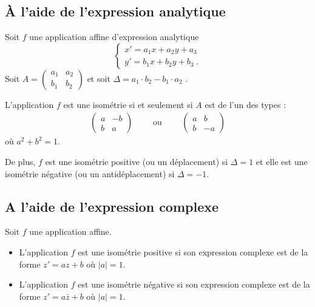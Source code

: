       \subsection{\`A l'aide de l'expression analytique}
            Soit $f$ une application affine d'expression analytique 
            \[
                  \left\lbrace
                        \begin{array}{l}
                              x' = a_1 x + a_2 y + a_3 \\
                              y' = b_1 x + b_2 y + b_3 \;.
                        \end{array}
                  \right.
            \]
            Soit 
            $ A = \begin{pmatrix} a_1 & a_2 \\ b_1 & b_2 \end{pmatrix} $
            et soit $\Delta = a_1 \cdot b_2 - b_1 \cdot a_2$
            .
            \begin{prop}
                  L'application $f$ est une isom\'etrie si et seulement si $A$ est de l'un des types : 
                  \begin{align*}
                        \begin{pmatrix}
                              a & -b \\ b & a 
                        \end{pmatrix}
                              \qquad \text{ ou } \qquad
                        \begin{pmatrix}
                              a & b \\ b & -a
                        \end{pmatrix}
                  \end{align*}
                  o\`u $a^2 + b^2 = 1$.
                  
                  De plus, $f$ est une isom\'etrie positive (ou un d\'eplacement) si $\Delta = 1$
                  et elle est une isom\'etrie n\'egative (ou un antid\'eplacement) si $\Delta = -1$.
            \end{prop}
      \subsection{A l'aide de l'expression complexe}
            Soit $f$ une application affine.
            \begin{itemize}
                  \item L'application $f$ est une isom\'etrie positive si son expression complexe est de la forme
                        $z' = a z + b$ o\`u $|a| = 1$.
                  \item L'application $f$ est une isom\'etrie n\'egative si son expression complexe est de la forme
                        $z' = a \bar{z} + b$ o\`u $|a| = 1$.
            \end{itemize}
      
